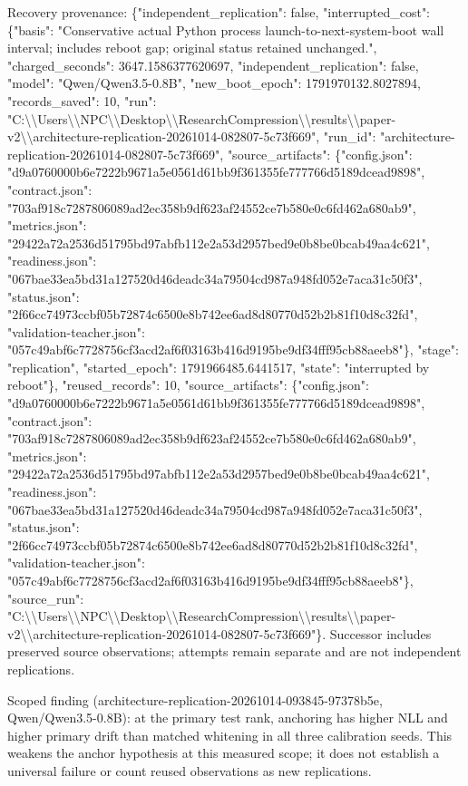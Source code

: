 \documentclass[10pt]{article}
\begin{document}
Recovery provenance: \{"independent\_replication": false, "interrupted\_cost": \{"basis": "Conservative actual Python process launch-to-next-system-boot wall interval; includes reboot gap; original status retained unchanged.", "charged\_seconds": 3647.1586377620697, "independent\_replication": false, "model": "Qwen/Qwen3.5-0.8B", "new\_boot\_epoch": 1791970132.8027894, "records\_saved": 10, "run": "C:\textbackslash{}\textbackslash{}Users\textbackslash{}\textbackslash{}NPC\textbackslash{}\textbackslash{}Desktop\textbackslash{}\textbackslash{}ResearchCompression\textbackslash{}\textbackslash{}results\textbackslash{}\textbackslash{}paper-v2\textbackslash{}\textbackslash{}architecture-replication-20261014-082807-5c73f669", "run\_id": "architecture-replication-20261014-082807-5c73f669", "source\_artifacts": \{"config.json": "d9a0760000b6e7222b9671a5e0561d61bb9f361355fe777766d5189dcead9898", "contract.json": "703af918c7287806089ad2ec358b9df623af24552ce7b580e0c6fd462a680ab9", "metrics.json": "29422a72a2536d51795bd97abfb112e2a53d2957bed9e0b8be0bcab49aa4c621", "readiness.json": "067bae33ea5bd31a127520d46deadc34a79504cd987a948fd052e7aca31c50f3", "status.json": "2f66cc74973ccbf05b72874c6500e8b742ee6ad8d80770d52b2b81f10d8c32fd", "validation-teacher.json": "057c49abf6c7728756cf3acd2af6f03163b416d9195be9df34fff95cb88aeeb8"\}, "stage": "replication", "started\_epoch": 1791966485.6441517, "state": "interrupted by reboot"\}, "reused\_records": 10, "source\_artifacts": \{"config.json": "d9a0760000b6e7222b9671a5e0561d61bb9f361355fe777766d5189dcead9898", "contract.json": "703af918c7287806089ad2ec358b9df623af24552ce7b580e0c6fd462a680ab9", "metrics.json": "29422a72a2536d51795bd97abfb112e2a53d2957bed9e0b8be0bcab49aa4c621", "readiness.json": "067bae33ea5bd31a127520d46deadc34a79504cd987a948fd052e7aca31c50f3", "status.json": "2f66cc74973ccbf05b72874c6500e8b742ee6ad8d80770d52b2b81f10d8c32fd", "validation-teacher.json": "057c49abf6c7728756cf3acd2af6f03163b416d9195be9df34fff95cb88aeeb8"\}, "source\_run": "C:\textbackslash{}\textbackslash{}Users\textbackslash{}\textbackslash{}NPC\textbackslash{}\textbackslash{}Desktop\textbackslash{}\textbackslash{}ResearchCompression\textbackslash{}\textbackslash{}results\textbackslash{}\textbackslash{}paper-v2\textbackslash{}\textbackslash{}architecture-replication-20261014-082807-5c73f669"\}. Successor includes preserved source observations; attempts remain separate and are not independent replications.


Scoped finding (architecture-replication-20261014-093845-97378b5e, Qwen/Qwen3.5-0.8B): at the primary test rank, anchoring has higher NLL and higher primary drift than matched whitening in all three calibration seeds. This weakens the anchor hypothesis at this measured scope; it does not establish a universal failure or count reused observations as new replications.
\end{document}
